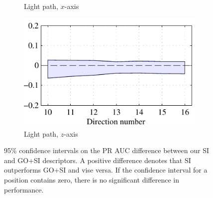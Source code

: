 \documentclass[thesis.tex]{subfiles}
\begin{document}
\begin{figure}[tb]
{\begin{subfigure}[t]{0.6242\textwidth}
		\caption{Light path, $x$-axis}
	\end{subfigure}
	\begin{subfigure}[t]{0.5618\textwidth}
		\includegraphics[width=\textwidth]{img/dtuResultsStatsSi_GoSi_6.pdf}
		\caption{Light path, $z$-axis}
	\end{subfigure}
	}
	\caption{95\% confidence intervals on the PR AUC difference between our SI and GO+SI descriptors. A positive difference denotes that SI outperforms GO+SI and vise versa. If the confidence interval for a position contains zero, there is no significant difference in performance.}
	\label{fig:dtuResultsStatsSi_GoSi}
\end{figure}
\end{document}
